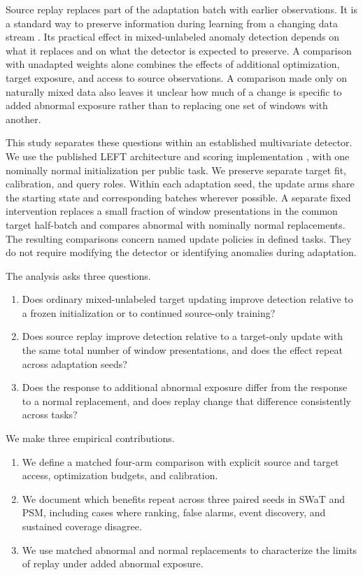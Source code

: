 \documentclass[
  american,
]{article}
\providecommand{\tightlist}{%
  \setlength{\itemsep}{0pt}\setlength{\parskip}{0pt}}
\begin{document}
Source replay replaces part of the adaptation batch with earlier
observations. It is a standard way to preserve information during
learning from a changing data stream
\citep{rolnick2019, buzzega2020, rostami2021}. Its practical effect in
mixed-unlabeled anomaly detection depends on what it replaces and on
what the detector is expected to preserve. A comparison with unadapted
weights alone combines the effects of additional optimization, target
exposure, and access to source observations. A comparison made only on
naturally mixed data also leaves it unclear how much of a change is
specific to added abnormal exposure rather than to replacing one set of
windows with another.

This study separates these questions within an established multivariate
detector. We use the published LEFT architecture and scoring
implementation \citep{left2026}, with one nominally normal
initialization per public task. We preserve separate target fit,
calibration, and query roles. Within each adaptation seed, the update
arms share the starting state and corresponding batches wherever
possible. A separate fixed intervention replaces a small fraction of
window presentations in the common target half-batch and compares
abnormal with nominally normal replacements. The resulting comparisons
concern named update policies in defined tasks. They do not require
modifying the detector or identifying anomalies during adaptation.

The analysis asks three questions.

\begin{enumerate}
\def\labelenumi{\arabic{enumi}.}
\tightlist
\item
  Does ordinary mixed-unlabeled target updating improve detection
  relative to a frozen initialization or to continued source-only
  training?
\item
  Does source replay improve detection relative to a target-only update
  with the same total number of window presentations, and does the
  effect repeat across adaptation seeds?
\item
  Does the response to additional abnormal exposure differ from the
  response to a normal replacement, and does replay change that
  difference consistently across tasks?
\end{enumerate}

We make three empirical contributions.

\begin{enumerate}
\def\labelenumi{\arabic{enumi}.}
\tightlist
\item
  We define a matched four-arm comparison with explicit source and
  target access, optimization budgets, and calibration.
\item
  We document which benefits repeat across three paired seeds in SWaT
  and PSM, including cases where ranking, false alarms, event discovery,
  and sustained coverage disagree.
\item
  We use matched abnormal and normal replacements to characterize the
  limits of replay under added abnormal exposure.
\end{enumerate}
\end{document}
